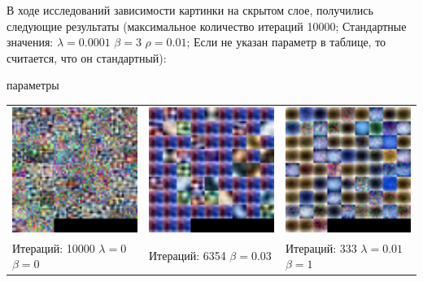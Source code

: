 \documentclass[12pt, a4paper]{article}
\begin{document}
			В ходе исследований зависимости картинки на скрытом слое, получились следующие результаты (максимальное количество итераций 10000; Стандартные значения: $\lambda = 0.0001$ $\beta = 3$ $\rho = 0.01$; Если не указан параметр в таблице, то считается, что он стандартный):
			\begin{center}
			{ параметры \\}

			\begin{tabular}{l l l}
				\includegraphics[width=5cm]{hidden_10000it_l=0_b=0.png} &
				\includegraphics[width=5cm]{hidden_10000it_6354it_b=0-03.png} &
				\includegraphics[width=5cm]{hidden_10000it_333it_l=0-01_b=1.png} \\

				\pbox{5cm}{Итераций: 10000\\ $\lambda = 0$ $\beta = 0$ \\} &
				\pbox{5cm}{Итераций: 6354\\ $\beta = 0.03$ \\} &
				\pbox{5cm}{Итераций: 333\\ $\lambda = 0.01$ $\beta = 1$ \\} \\
				


\end{tabular}
\end{center}
\end{document}
